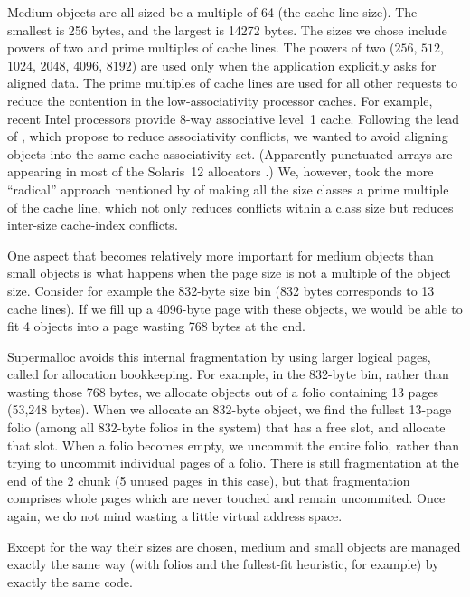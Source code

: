 \documentclass[pldi]{sigplanconf-pldi15}
\begin{document}
Medium objects are all sized be a multiple of 64 (the cache line
size).  The smallest is 256 bytes, and the largest is 14272 bytes.
The sizes we chose include powers of two and prime multiples of cache
lines.  The powers of two ($256$, $512$, $1024$, $2048$, $4096$,
$8192$) are used only when the application explicitly asks for aligned
data.  The prime multiples of cache lines are used for all other
requests to reduce the contention in the low-associativity processor
caches. For example, recent Intel processors provide 8-way associative
level~1 cache.  Following the lead of \cite{AfekDiMo11}, which propose
 to reduce associativity conflicts, we wanted
to avoid aligning objects into the same cache associativity
set. (Apparently punctuated arrays are appearing in most of the
Solaris~12 allocators \cite{Dice14b}.)  We, however, took the more
``radical'' approach mentioned by \cite{Dice14a} of making all the
size classes a prime multiple of the cache line, which not only
reduces conflicts within a class size but reduces inter-size
cache-index conflicts.

One aspect that becomes relatively more important for medium objects
than small objects is what happens when the page size is not a
multiple of the object size.  Consider for example the 832-byte size
bin (832 bytes corresponds to 13 cache lines).  If we fill up a
4096-byte page with these objects, we would be able to fit 4 objects
into a page wasting 768 bytes at the end.  

Supermalloc avoids this internal fragmentation by using larger logical
pages, called  for allocation bookkeeping.  For example,
in the 832-byte bin, rather than wasting those 768 bytes, we allocate
objects out of a folio containing 13 pages (53,248 bytes). When we
allocate an 832-byte object, we find the fullest 13-page folio (among
all 832-byte folios in the system) that has a free slot, and allocate
that slot.  When a folio becomes empty, we uncommit the entire folio,
rather than trying to uncommit individual pages of a folio.  There is
still fragmentation at the end of the \unit{2}\mebi\byte{} chunk (5
unused pages in this case), but that fragmentation comprises whole
pages which are never touched and remain uncommited.  Once again, we
do not mind wasting a little virtual address space.

Except for the way their sizes are chosen, medium and small objects
are managed exactly the same way (with folios and the fullest-fit
heuristic, for example) by exactly the same code.
\end{document}
